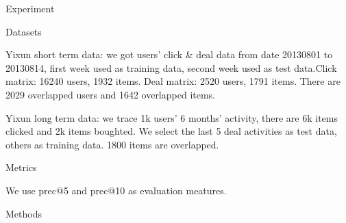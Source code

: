 \begin{section}{Experiment}
  \begin{subsection}{Datasets}
\par{Yixun short term data: we got users' click \& deal data from date 20130801 to 20130814, first week used as training data, second week used as test data.Click matrix: 16240 users, 1932 items. Deal matrix: 2520 users, 1791 items. There are 2029 overlapped users and 1642 overlapped items.}
\par{Yixun long term data: we trace 1k users' 6 months' activity, there are 6k items clicked and 2k items boughted. We select the last 5 deal activities as test data, others as training data. 1800 items are overlapped.}
\end{subsection}

\begin{subsection}{Metrics}
\par{We use prec@5 and prec@10 as evaluation meatures.}
  
\end{subsection}

\begin{subsection}{Methods}  



\end{subsection}
\end{section}
